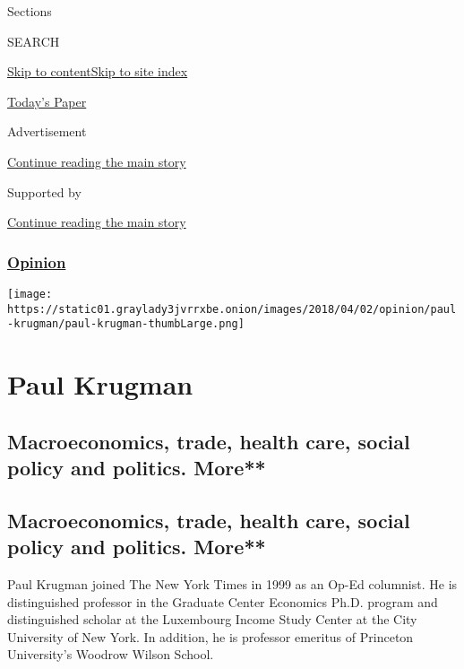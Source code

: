 Sections

SEARCH

\protect\hyperlink{site-content}{Skip to
content}\protect\hyperlink{site-index}{Skip to site index}

\href{https://myaccount.nytimes3xbfgragh.onion/auth/login?response_type=cookie\&client_id=vi}{}

\href{https://www.nytimes3xbfgragh.onion/section/todayspaper}{Today's
Paper}

Advertisement

\protect\hyperlink{after-top}{Continue reading the main story}

Supported by

\protect\hyperlink{after-sponsor}{Continue reading the main story}

\hypertarget{opinion}{%
\subsubsection{\texorpdfstring{\href{/section/opinion}{Opinion}}{Opinion}}\label{opinion}}

\texttt{[image: https://static01.graylady3jvrrxbe.onion/images/2018/04/02/opinion/paul-krugman/paul-krugman-thumbLarge.png]}

\hypertarget{paul-krugman}{%
\section{Paul Krugman}\label{paul-krugman}}

\hypertarget{macroeconomics-trade-health-care-social-policy-and-politics-more}{%
\subsection{Macroeconomics, trade, health care, social policy and
politics.
More**}\label{macroeconomics-trade-health-care-social-policy-and-politics-more}}

\hypertarget{macroeconomics-trade-health-care-social-policy-and-politics-more-1}{%
\subsection{Macroeconomics, trade, health care, social policy and
politics.
More**}\label{macroeconomics-trade-health-care-social-policy-and-politics-more-1}}

Paul Krugman joined The New York Times in 1999 as an Op-Ed columnist. He
is distinguished professor in the Graduate Center Economics Ph.D.
program and distinguished scholar at the Luxembourg Income Study Center
at the City University of New York. In addition, he is professor
emeritus of Princeton University's Woodrow Wilson School.

